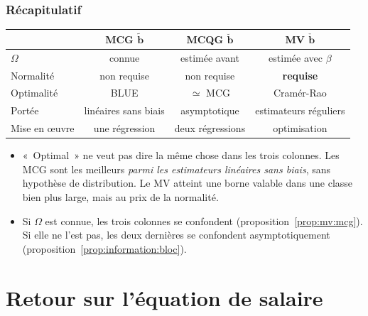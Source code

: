 \documentclass[10pt]{beamer}
\begin{document}
\begin{frame}
  \frametitle{Récapitulatif}

  \begin{center}
    \footnotesize
    \renewcommand{\arraystretch}{1.4}
    \setlength{\tabcolsep}{4pt}
    \begin{tabular}{lccc}
      \toprule
                       & MCG $\tilde{\mathbf b}$
                       & MCQG $\breve{\mathbf b}$
                       & MV $\check{\mathbf b}$\\
      \midrule
      $\Omega$         & connue           & estimée avant   & estimée avec $\beta$\\
      Normalité        & non requise      & non requise     & \textbf{requise}\\
      Optimalité       & BLUE             & $\simeq$ MCG    & Cramér-Rao\\
      Portée           & linéaires sans biais & asymptotique & estimateurs réguliers\\
      Mise en \oe uvre & une régression   & deux régressions & optimisation\\
      \bottomrule
    \end{tabular}
  \end{center}

  \bigskip

  \begin{itemize}

  \item[\dbend] «~Optimal~» ne veut pas dire la même chose dans les trois
    colonnes. Les MCG sont les meilleurs \emph{parmi les estimateurs linéaires
      sans biais}, sans hypothèse de distribution. Le MV atteint une borne
    valable dans une classe bien plus large, mais au prix de la
    normalité.\newline

  \item Si $\Omega$ est connue, les trois colonnes se confondent
    (proposition~\ref{prop:mv:mcg}). Si elle ne l'est pas, les deux dernières se
    confondent asymptotiquement (proposition~\ref{prop:information:bloc}).

  \end{itemize}

\end{frame}


\section{Retour sur l'équation de salaire}
\end{document}
